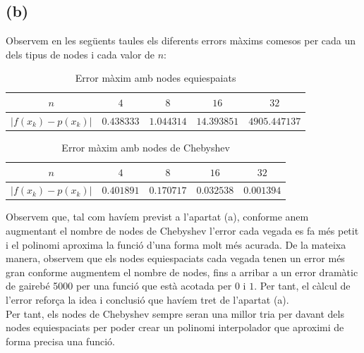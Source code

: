 \documentclass[a4paper,11pt]{article}
\begin{document}
\subsection*{(b)}
  Observem en les següents taules els diferents errors màxims comesos per cada un dels tipus de nodes i cada valor de $n$:
  \begin{table}[H]
  \begin{center}
    \begin{tabular}{|c|c|c|c|c|}
      \hline 
      $n$ & $4$ & $8$ & $16$ & $32$\\
      \hline
      $\left| f(x_k) - p(x_k) \right|$
      & 
      $0.438333$
      & 
      $1.044314$
      &
      $14.393851$
      &
      $4905.447137$
      \\
      \hline
    \end{tabular}
    \caption{Error màxim amb nodes equiespaiats}
  \end{center}
  \end{table}
  \begin{table}[H]
  \begin{center}
    \begin{tabular}{|c|c|c|c|c|}
      \hline 
      $n$ & $4$ & $8$ & $16$ & $32$\\
      \hline 
      $\left| f(x_k) - p(x_k) \right|$
      & 
      $0.401891$
      & 
      $0.170717$
      &
      $0.032538$
      &
      $0.001394$
      \\
      \hline
    \end{tabular}
    \caption{Error màxim amb nodes de Chebyshev}
  \end{center}
  \end{table}
  Observem que, tal com havíem previst a l'apartat (a), conforme anem augmentant el nombre de nodes de Chebyshev l'error cada vegada es fa més petit i el polinomi aproxima la funció d'una forma molt més acurada. De la mateixa manera, observem que els nodes equiespaciats cada vegada tenen un error més gran conforme augmentem el nombre de nodes, fins a arribar a un error dramàtic de gairebé 5000 per una funció que està acotada per $0$ i $1$. Per tant, el càlcul de l'error reforça la idea i conclusió que havíem tret de l'apartat (a).\\
  Per tant, els nodes de Chebyshev sempre seran una millor tria per davant dels nodes equiespaciats per poder crear un polinomi interpolador que aproximi de forma precisa una funció.
  \clearpage
\end{document}
